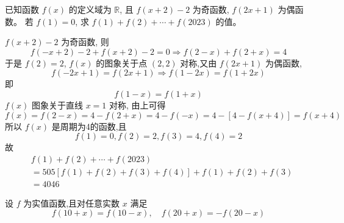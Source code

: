 \begin{questions}
    \question 已知函数 $f(x)$ 的定义域为 $\mathbb{R}$, 且 $f(x+2)-2$ 为奇函数, $f(2x+1)$ 为偶函数。 若 $f(1)=0$, 求 $f(1)+f(2)+\cdots+f(2023)$ 的值。
    \begin{solution}
        $f(x+2)-2$ 为奇函数, 则
        \[
        f(-x+2)-2+f(x+2)-2=0 \Rightarrow f(2-x)+f(2+x)=4
        \]
        于是 $f(2)=2$, $f(x)$ 的图象关于点 $(2,2)$ 对称,又由 $f(2x+1)$ 为偶函数, 
        $$f(-2x+1)=f(2x+1)\Rightarrow f(1-2x)=f(1+2x)$$ 
        即
        $$f(1-x)=f(1+x)$$
        $f(x)$ 图象关于直线 $x=1$ 对称,
        由上可得 
        $$f(x)=f(2-x)=4-f(2+x)=4-f(-x)=4-[4-f(x+4)]=f(x+4)$$
        所以 $f(x)$ 是周期为4的函数,且
        \[
        f(1)=0,f(2)=2,f(3)=4,f(4)=2
        \]
        故
        \begin{align*}   
        &f(1)+f(2)+\cdots+f(2023)\\
        &=505[f(1)+f(2)+f(3)+f(4)]+f(1)+f(2)+f(3)\\
        &=4046 
        \end{align*}
    \end{solution}

    \question 设 $f$ 为实值函数,且对任意实数 $x$ 满足
    \[
    f(10+x) = f(10-x), \quad f(20+x) = -f(20-x)
    \]


\end{questions}
